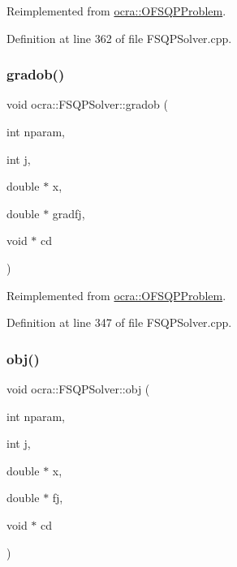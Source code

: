 Reimplemented from \hyperlink{classocra_1_1OFSQPProblem_ab89eefbaf9b86a89a0ceede0b4b61284}{ocra\+::\+O\+F\+S\+Q\+P\+Problem}.



Definition at line 362 of file F\+S\+Q\+P\+Solver.\+cpp.

\hypertarget{classocra_1_1FSQPSolver_ac88cddc691c4bf9862f9d6f30599a098}{}\label{classocra_1_1FSQPSolver_ac88cddc691c4bf9862f9d6f30599a098} 
\subsubsection{\texorpdfstring{gradob()}{gradob()}}
{\footnotesize\ttfamily void ocra\+::\+F\+S\+Q\+P\+Solver\+::gradob (\begin{DoxyParamCaption}\item[{int}]{nparam,  }\item[{int}]{j,  }\item[{double $\ast$}]{x,  }\item[{double $\ast$}]{gradfj,  }\item[{void $\ast$}]{cd }\end{DoxyParamCaption})\hspace{0.3cm}{\ttfamily [virtual]}}



Reimplemented from \hyperlink{classocra_1_1OFSQPProblem_a1300d237d9b87df1f71db7129c38458a}{ocra\+::\+O\+F\+S\+Q\+P\+Problem}.



Definition at line 347 of file F\+S\+Q\+P\+Solver.\+cpp.

\hypertarget{classocra_1_1FSQPSolver_a1275a02361629480cc18d44ce46d915c}{}\label{classocra_1_1FSQPSolver_a1275a02361629480cc18d44ce46d915c} 
\subsubsection{\texorpdfstring{obj()}{obj()}}
{\footnotesize\ttfamily void ocra\+::\+F\+S\+Q\+P\+Solver\+::obj (\begin{DoxyParamCaption}\item[{int}]{nparam,  }\item[{int}]{j,  }\item[{double $\ast$}]{x,  }\item[{double $\ast$}]{fj,  }\item[{void $\ast$}]{cd }\end{DoxyParamCaption})\hspace{0.3cm}{\ttfamily [virtual]}}



